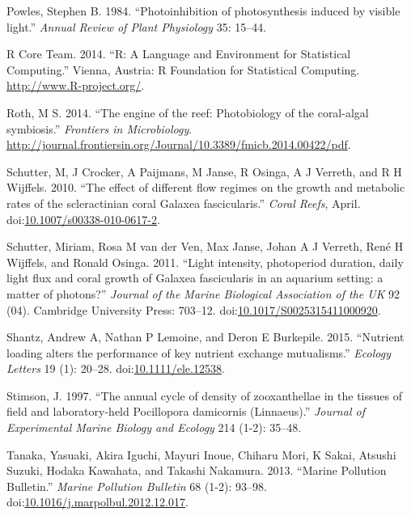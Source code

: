 \documentclass[]{elsarticle} %
\begin{document}
\hypertarget{ref-Powles:1984tm}{}
Powles, Stephen B. 1984. ``Photoinhibition of photosynthesis induced by
visible light.'' \emph{Annual Review of Plant Physiology} 35: 15--44.

\hypertarget{ref-RALanguageandEn:2014wf}{}
R Core Team. 2014. ``R: A Language and Environment for Statistical
Computing.'' Vienna, Austria: R Foundation for Statistical Computing.
\url{http://www.R-project.org/}.

\hypertarget{ref-Roth:2014wf}{}
Roth, M S. 2014. ``The engine of the reef: Photobiology of the
coral-algal symbiosis.'' \emph{Frontiers in Microbiology}.
\url{http://journal.frontiersin.org/Journal/10.3389/fmicb.2014.00422/pdf}.

\hypertarget{ref-Schutter:2010p7758}{}
Schutter, M, J Crocker, A Paijmans, M Janse, R Osinga, A J Verreth, and
R H Wijffels. 2010. ``The effect of different flow regimes on the growth
and metabolic rates of the scleractinian coral Galaxea fascicularis.''
\emph{Coral Reefs}, April.
doi:\href{https://doi.org/10.1007/s00338-010-0617-2}{10.1007/s00338-010-0617-2}.

\hypertarget{ref-Schutter:2011ie}{}
Schutter, Miriam, Rosa M van der Ven, Max Janse, Johan A J Verreth, René
H Wijffels, and Ronald Osinga. 2011. ``Light intensity, photoperiod
duration, daily light flux and coral growth of Galaxea fascicularis in
an aquarium setting: a matter of photons?'' \emph{Journal of the Marine
Biological Association of the UK} 92 (04). Cambridge University Press:
703--12.
doi:\href{https://doi.org/10.1017/S0025315411000920}{10.1017/S0025315411000920}.

\hypertarget{ref-Shantz:2015dz}{}
Shantz, Andrew A, Nathan P Lemoine, and Deron E Burkepile. 2015.
``Nutrient loading alters the performance of key nutrient exchange
mutualisms.'' \emph{Ecology Letters} 19 (1): 20--28.
doi:\href{https://doi.org/10.1111/ele.12538}{10.1111/ele.12538}.

\hypertarget{ref-Stimson:1997p3837}{}
Stimson, J. 1997. ``The annual cycle of density of zooxanthellae in the
tissues of field and laboratory-held Pocillopora damicornis
(Linnaeus).'' \emph{Journal of Experimental Marine Biology and Ecology}
214 (1-2): 35--48.

\hypertarget{ref-Tanaka:2013dj}{}
Tanaka, Yasuaki, Akira Iguchi, Mayuri Inoue, Chiharu Mori, K Sakai,
Atsushi Suzuki, Hodaka Kawahata, and Takashi Nakamura. 2013. ``Marine
Pollution Bulletin.'' \emph{Marine Pollution Bulletin} 68 (1-2): 93--98.
doi:\href{https://doi.org/10.1016/j.marpolbul.2012.12.017}{10.1016/j.marpolbul.2012.12.017}.
\end{document}
